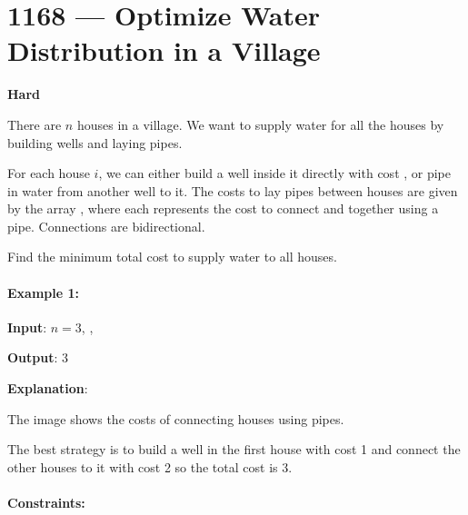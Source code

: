\section{1168 --- Optimize Water Distribution in a Village}

\textbf{Hard}

There are $n$ houses in a village. We want to supply water for all the houses by building wells and laying pipes.

For each house $i$, we can either build a well inside it directly with cost , or pipe in water from another well to it. The costs to lay pipes between houses are given by the array , where each  represents the cost to connect  and  together using a pipe. Connections are bidirectional.

Find the minimum total cost to supply water to all houses.


\paragraph{Example 1:}

\begin{flushleft}
\textbf{Input}: $ n = 3 $, , 

\textbf{Output}: 3

\textbf{Explanation}: 

The image shows the costs of connecting houses using pipes.

The best strategy is to build a well in the first house with cost 1 and connect the other houses to it with cost 2 so the total cost is 3.

\begin{figure}[H]
\end{figure}

\end{flushleft}
 

\paragraph{Constraints:}

